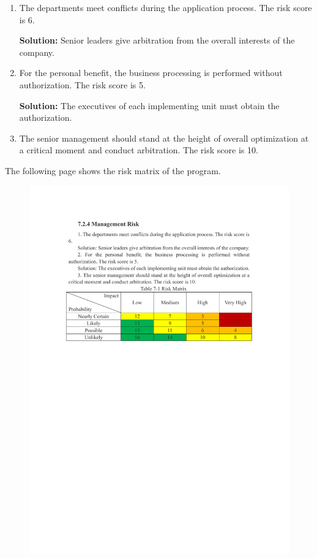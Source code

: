 \begin{enumerate}
\item The departments meet conflicts during the application process. The risk score is 6.

\textbf{Solution:} Senior leaders give arbitration from the overall interests of the company.

\item For the personal benefit, the business processing is performed without authorization. The risk score is 5.

\textbf{Solution:} The executives of each implementing unit must obtain the authorization.

\item The senior management should stand at the height of overall optimization at a critical moment and conduct arbitration. The risk score is 10.
\end{enumerate}

The following page shows the risk matrix of the program.

\begin{figure}[!htb]
\centering
\includegraphics[width=15cm]{pic/riskMatrix.pdf}
\end{figure}
